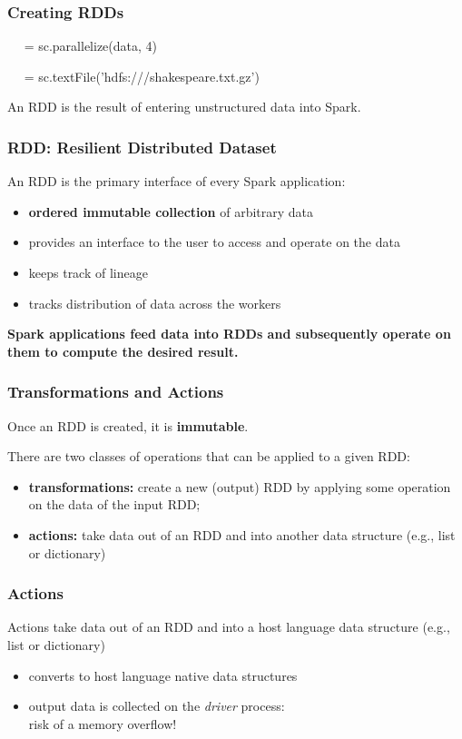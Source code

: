 \documentclass[english,serif,mathserif]{beamer}
\begin{document}
\begin{frame}[fragile]
  \frametitle{Creating RDDs}
  \begin{center}
    \begin{python}
      ~~ = sc.parallelize(data, 4)

~~ = sc.textFile('hdfs:///shakespeare.txt.gz')
    \end{python}

      \+
      An RDD is the result of entering unstructured data into Spark.
    \end{center}
\end{frame}


\begin{frame}

  \frametitle{RDD: Resilient Distributed Dataset}

  An RDD is the primary interface of every Spark application:
  \begin{itemize}
  \item \textbf{ordered immutable collection} of arbitrary data
  \item provides an interface to the user to access and operate on the data
  \item keeps track of lineage
  \item tracks distribution of data across the workers
  \end{itemize}

  \+ \textbf{Spark applications feed data into RDDs
    and subsequently operate on them to compute the desired result.}
\end{frame}


\begin{frame}
  \frametitle{Transformations and Actions}

  Once an RDD is created, it is \textbf{immutable}.

  \+
  There are two classes of operations that can be applied to a given RDD:
  \begin{itemize}
  \item \textbf{transformations:} create a new (output) RDD by applying some operation on
    the data of the input RDD;
  \item \textbf{actions:} take data out of an RDD and into another data
    structure (e.g., list or dictionary)
  \end{itemize}
\end{frame}


\begin{frame}
  \frametitle{Actions}

  Actions take data out of an RDD and into a host language data
  structure (e.g., list or dictionary)
  \begin{itemize}
  \item converts to host language native data structures
  \item output data is collected on the \emph{driver} process: \\
    risk of a memory overflow!
  \end{itemize}
\end{frame}
\end{document}
